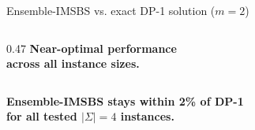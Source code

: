 \documentclass{beamer}
\begin{document}
\begin{frame}{Ensemble-IMSBS vs. exact DP-1 solution ($m=2$)}
\begin{columns}[T,onlytextwidth]
\begin{column}{0.47\textwidth}
			\textbf{\footnotesize{
					Near-optimal performance\\
					across all instance sizes.}}
		\end{column}
		
	\end{columns}
	
	\vspace{0.55cm}
	
	\begin{center}
		\footnotesize
		\textbf{Ensemble-IMSBS stays within 2\% of DP-1\\
			for all tested $|\Sigma|=4$ instances.}
	\end{center}
	
\end{frame}
 
\end{document}
